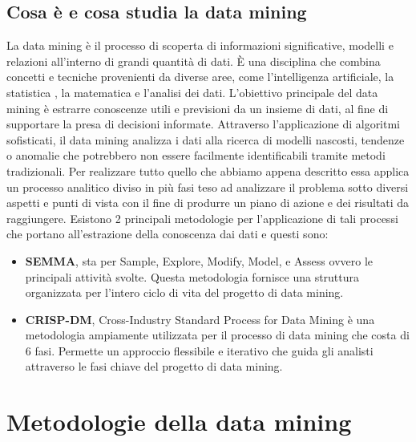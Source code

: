 \documentclass[italian,12pt,a4paper]{article}
\begin{document}
    \subsection{Cosa è e cosa studia la data mining}
    La data mining è il processo di scoperta di informazioni significative, modelli e relazioni all'interno di grandi quantità di dati. È una disciplina che combina concetti e tecniche provenienti da diverse aree, come l'intelligenza artificiale, la statistica , la matematica e l'analisi dei dati.
    L'obiettivo principale del data mining è estrarre conoscenze utili e previsioni da un insieme di dati, al fine di supportare la presa di decisioni informate. Attraverso l'applicazione di algoritmi sofisticati, il data mining analizza i dati alla ricerca di modelli nascosti, tendenze o anomalie che potrebbero non essere facilmente identificabili tramite metodi tradizionali. Per realizzare tutto quello che abbiamo appena descritto essa applica un processo analitico diviso in più fasi teso ad analizzare il problema sotto diversi aspetti e punti di vista con il fine di produrre un piano di azione e dei risultati da raggiungere. Esistono 2 principali metodologie per l'applicazione di tali processi che portano all'estrazione della conoscenza dai dati e questi sono:
    \\
    
    \begin{itemize}
		\item  \textbf{SEMMA}, sta per Sample, Explore, Modify, Model, e Assess ovvero le principali attività svolte. Questa metodologia fornisce una struttura organizzata per l'intero ciclo di vita del progetto di data mining.
		\item  \textbf{CRISP-DM}, Cross-Industry Standard Process for Data Mining è una metodologia ampiamente utilizzata per il processo di data mining che costa di 6 fasi. Permette  un approccio flessibile e iterativo che guida gli analisti attraverso le fasi chiave del progetto di data mining.   
	\end{itemize}

    \vspace{30pt}
    
   \section{Metodologie della data mining }
   
\end{document}

